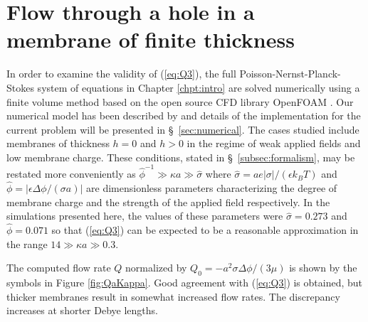 \section{Flow through a hole in a membrane of finite thickness}
\label{sec:fullSim}
In order to examine the validity of (\ref{eq:Q3}), the full Poisson-Nernst-Planck-Stokes system of equations in Chapter \ref{chpt:intro} are solved numerically using a finite volume method based on the open source CFD library OpenFOAM \cite{OPENFOAM}. Our numerical model has been described by \cite{Mao2013} and details of the implementation for the current problem will be presented in \S~\ref{sec:numerical}. The cases studied include membranes of thickness $h=0$ and $h>0$ in the regime of weak applied fields and low membrane charge. These conditions, stated in \S~\ref{subsec:formalism}, may be restated more conveniently as $ \hat{\phi}^{-1} \gg \kappa a \gg \hat{\sigma}$ where $\hat{\sigma} = a e |\sigma| / (\epsilon k_BT)$ and $\hat{\phi} = |\epsilon\Delta \phi / (\sigma a)|$ are dimensionless parameters characterizing the degree of membrane charge and the strength of the applied field respectively. In the simulations presented here, the values of these parameters were $\hat{\sigma} = 0.273$ and $\hat{\phi}=0.071$ so that (\ref{eq:Q3}) can be expected to be a reasonable approximation in the range $14 \gg \kappa a \gg 0.3$. 

The computed flow rate $Q$ normalized by $Q_{0} =  - a^2 \sigma\Delta\phi/(3\mu)$ is shown 
by the symbols in Figure \ref{fig:QaKappa}. Good agreement with (\ref{eq:Q3}) is obtained, but  
thicker membranes result in somewhat increased flow rates. The discrepancy increases at 
shorter Debye lengths.  

